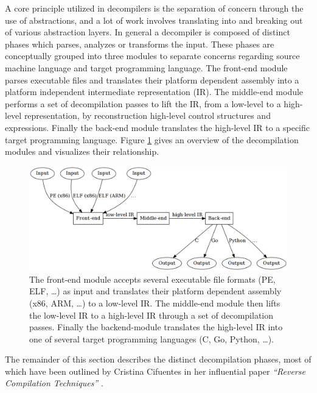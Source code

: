 \documentclass[12pt, a4paper]{article}
\begin{document}
A core principle utilized in decompilers is the separation of concern through the use of abstractions, and a lot of work involves translating into and breaking out of various abstraction layers. In general a decompiler is composed of distinct phases which parses, analyzes or transforms the input. These phases are conceptually grouped into three modules to separate concerns regarding source machine language and target programming language. The front-end module parses executable files and translates their platform dependent assembly into a platform independent intermediate representation (IR). The middle-end module performs a set of decompilation passes to lift the IR, from a low-level to a high-level representation, by reconstruction high-level control structures and expressions. Finally the back-end module translates the high-level IR to a specific target programming language. Figure \ref{modules_overview} gives an overview of the decompilation modules and visualizes their relationship.

\begin{figure}[htbp]
	\begin{center}
		\includegraphics[width=\textwidth]{inc/modules_overview.png}
		\caption{The front-end module accepts several executable file formats (PE, ELF, …) as input and translates their platform dependent assembly (x86, ARM, …) to a low-level IR. The middle-end module then lifts the low-level IR to a high-level IR through a set of decompilation passes. Finally the backend-module translates the high-level IR into one of several target programming languages (C, Go, Python, …).}
		\label{modules_overview}
	\end{center}
\end{figure}

The remainder of this section describes the distinct decompilation phases, most of which have been outlined by Cristina Cifuentes in her influential paper \textit{``Reverse Compilation Techniques''} \cite{rev_comp}.
\end{document}
